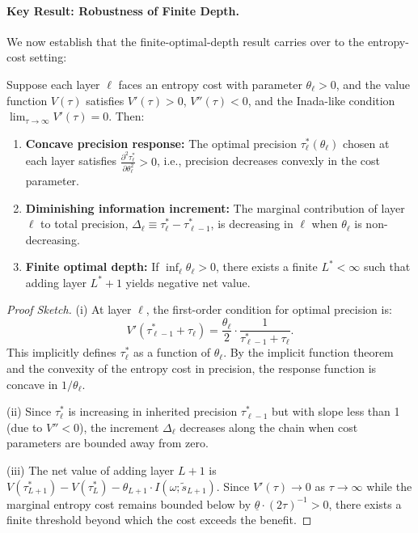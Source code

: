 \paragraph{Key Result: Robustness of Finite Depth.} We now establish that the finite-optimal-depth result carries over to the entropy-cost setting:

\begin{proposition}\label{prop:finite_depth_entropy}
Suppose each layer $\ell$ faces an entropy cost with parameter $\theta_\ell > 0$, and the value function $V(\tau)$ satisfies $V'(\tau) > 0$, $V''(\tau) < 0$, and the Inada-like condition $\lim_{\tau \to \infty} V'(\tau) = 0$. Then:
\begin{enumerate}
\item[(i)] \textbf{Concave precision response:} The optimal precision $\tau_\ell^{*}(\theta_\ell)$ chosen at each layer satisfies $\frac{\partial^2 \tau_\ell^{*}}{\partial \theta_\ell^2} > 0$, i.e., precision decreases convexly in the cost parameter.
\item[(ii)] \textbf{Diminishing information increment:} The marginal contribution of layer $\ell$ to total precision, $\Delta_\ell \equiv \tau_\ell^{*} - \tau_{\ell-1}^{*}$, is decreasing in $\ell$ when $\theta_\ell$ is non-decreasing.
\item[(iii)] \textbf{Finite optimal depth:} If $\inf_\ell \theta_\ell > 0$, there exists a finite $L^{*} < \infty$ such that adding layer $L^{*}+1$ yields negative net value.
\end{enumerate}
\end{proposition}

\begin{proof}[Proof Sketch]
(i) At layer $\ell$, the first-order condition for optimal precision is:
\begin{equation}
V'(\tau_{\ell-1}^{*} + \tau_\ell) = \frac{\theta_\ell}{2} \cdot \frac{1}{\tau_{\ell-1}^{*} + \tau_\ell}.
\end{equation}
This implicitly defines $\tau_\ell^{*}$ as a function of $\theta_\ell$. By the implicit function theorem and the convexity of the entropy cost in precision, the response function is concave in $1/\theta_\ell$.

(ii) Since $\tau_\ell^{*}$ is increasing in inherited precision $\tau_{\ell-1}^{*}$ but with slope less than 1 (due to $V'' < 0$), the increment $\Delta_\ell$ decreases along the chain when cost parameters are bounded away from zero.

(iii) The net value of adding layer $L+1$ is $V(\tau_{L+1}^{*}) - V(\tau_{L}^{*}) - \theta_{L+1} \cdot I(\omega; \tilde{s}_{L+1})$. Since $V'(\tau) \to 0$ as $\tau \to \infty$ while the marginal entropy cost remains bounded below by $\underline{\theta} \cdot (2\tau)^{-1} > 0$, there exists a finite threshold beyond which the cost exceeds the benefit.
\end{proof}

